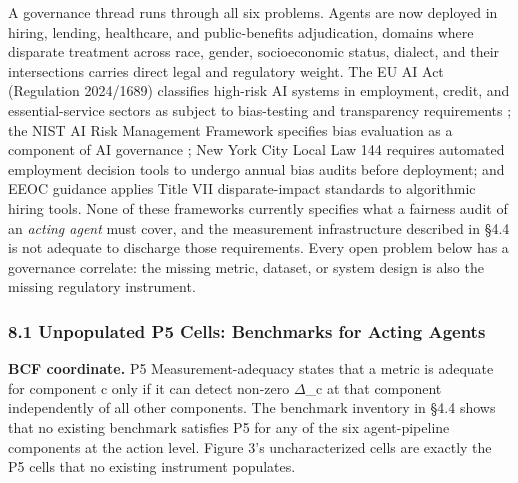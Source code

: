 \documentclass[10pt]{article}
\begin{document}
A governance thread runs through all six problems. Agents are now deployed in hiring, lending, healthcare, and public-benefits adjudication, domains where disparate treatment across race, gender, socioeconomic status, dialect, and their intersections carries direct legal and regulatory weight. The EU AI Act (Regulation 2024/1689) classifies high-risk AI systems in employment, credit, and essential-service sectors as subject to bias-testing and transparency requirements \cite{parliament2024regulation}; the NIST AI Risk Management Framework specifies bias evaluation as a component of AI governance \cite{nist2023artificial}; New York City Local Law 144 requires automated employment decision tools to undergo annual bias audits before deployment; and EEOC guidance applies Title VII disparate-impact standards to algorithmic hiring tools. None of these frameworks currently specifies what a fairness audit of an \emph{acting agent} must cover, and the measurement infrastructure described in \S{}4.4 is not adequate to discharge those requirements. Every open problem below has a governance correlate: the missing metric, dataset, or system design is also the missing regulatory instrument.

\subsubsection*{8.1 Unpopulated P5 Cells: Benchmarks for Acting Agents}

\textbf{BCF coordinate.} P5 Measurement-adequacy states that a metric is adequate for component c only if it can detect non-zero $\Delta$\_c at that component independently of all other components. The benchmark inventory in \S{}4.4 shows that no existing benchmark satisfies P5 for any of the six agent-pipeline components at the action level. Figure 3's uncharacterized cells are exactly the P5 cells that no existing instrument populates.
\end{document}
